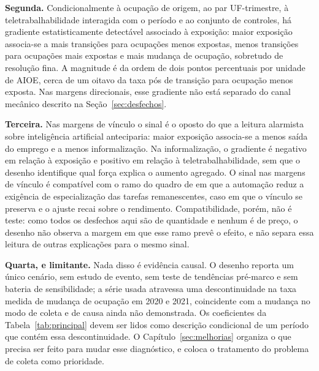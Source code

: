 \textbf{Segunda.} Condicionalmente à ocupação de origem, ao par UF-trimestre, à
teletrabalhabilidade interagida com o período e ao conjunto de controles, há
gradiente estatisticamente detectável associado à exposição: maior exposição
associa-se a mais transições para ocupações menos expostas, menos transições
para ocupações mais expostas e mais mudança de ocupação, sobretudo de resolução
fina. A magnitude é da ordem de dois pontos percentuais por unidade de AIOE, cerca
de um oitavo da taxa pós de transição para ocupação menos exposta. Nas margens
direcionais, esse gradiente não está separado do canal mecânico descrito na
Seção~\ref{sec:desfechos}.

\textbf{Terceira.} Nas margens de vínculo o sinal é o oposto do que a leitura
alarmista sobre inteligência artificial anteciparia: maior exposição associa-se a
menos saída do emprego e a menos informalização. Na informalização, o gradiente é negativo em relação à exposição e positivo em
relação à teletrabalhabilidade, sem que o desenho identifique qual força explica
o aumento agregado. O sinal nas margens de vínculo é compatível com o ramo do
quadro de  em que a automação reduz a exigência de
especialização das tarefas remanescentes, caso em que o vínculo se preserva e o
ajuste recai sobre o rendimento. Compatibilidade, porém, não é teste: como todos
os desfechos aqui são de quantidade e nenhum é de preço, o desenho não observa a
margem em que esse ramo prevê o efeito, e não separa essa leitura de outras
explicações para o mesmo sinal.

\textbf{Quarta, e limitante.} Nada disso é evidência causal. O desenho reporta um
único cenário, sem estudo de evento, sem teste de tendências pré-marco e sem
bateria de sensibilidade; a série usada atravessa uma descontinuidade na taxa medida de mudança de
ocupação em 2020 e 2021, coincidente com a mudança no modo de coleta e de causa
ainda não demonstrada. Os coeficientes da Tabela~\ref{tab:principal}
devem ser lidos como descrição condicional de um período que contém essa
descontinuidade. O Capítulo~\ref{sec:melhorias} organiza o que precisa ser feito
para mudar esse diagnóstico, e coloca o tratamento do problema de coleta como
prioridade.
